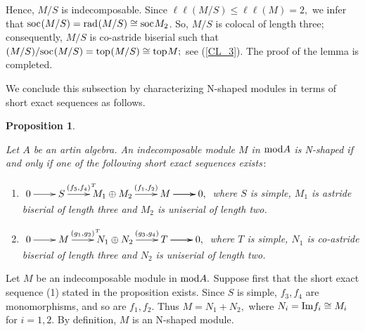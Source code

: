 \documentclass[10pt]{amsart}
\newtheorem{Prop}[Theo]{Proposition}
\theoremstyle{definition}
\newcommand{\mmod}{{\rm mod}}
\newcommand{\rad}{{\rm rad}\hspace{.5pt}}
\newcommand{\soc}{{\rm soc}\hspace{.5pt}}
\newcommand{\ntop}{{\rm top}\hspace{.5pt}}
\newcommand{\hp}{\hspace{.5pt}}
\newcommand{\vp}{\vspace{.5pt}}
\begin{document}
Hence, $M/S$ is indecomposable. Since $\ell\ell(M/S)\le \ell\ell(M)=2,$ we infer that $\soc(M/S)=\rad(M/S)\cong \soc M_2$. So, $M/S$ is colocal of length three; consequently, $M/S$ is co-astride biserial such that $(M/S)/\soc(M/S)=\ntop(M/S)\cong \ntop M;$ see (\ref{CL_3}). The proof of the lemma is completed. 

\smallskip

We conclude this subsection by characterizing N-shaped modules in terms of short exact sequences as follows.

\begin{Prop}\label{N_mod_ses}

Let $A$ be an artin algebra. An indecomposable module $M$ in $\mmod A$ is N-shaped if and only if one of the following short exact sequences exists$\hp\hp :$

\begin{enumerate}[$(1)$]

\vspace{-3pt}

\item $\xymatrixcolsep{22pt}\xymatrix{0\ar[r] & S \ar[r]^-{\hspace{6pt} (f_3, f_4)^{\hp T}} & M_1\oplus M_2\ar[r]^-{(f_1, f_2)} & M \ar[r] \ar[r] & 0,}$ \hspace{-6pt} \vspace{-.5pt} where $S$ is simple, $M_1$ is astride biserial of length three and $M_2$ is uniserial of length two. 


\item $\xymatrixcolsep{22pt}\xymatrix{0\ar[r] & M \ar[r]^-{\hspace{6pt} (g_1, g_2)^{\hp T}} & N_1\oplus N_2\ar[r]^-{(g_3, g_4)} & T \ar[r] \ar[r] & 0,}$ \hspace{-6pt} \vspace{-0pt}  where $T$ is simple, $N_1$ is co-astride biserial of length three and $N_2$ is uniserial of length two. 

\end{enumerate}

\end{Prop}

\vspace{-1.5pt}

 Let $M$ be an indecomposable module in $\mmod A.$ Suppose first that the short exact sequence (1) stated in the proposition exists. Since $S$ is simple, $f_3, f_4$ are monomorphisms, and so are $f_1, f_2$. Thus $M=N_1+N_2,$ where $N_i={\rm Im} f_i\cong M_i$ for $i=1, 2.$ By definition, $M$ is an N-shaped module. 
\end{document}
